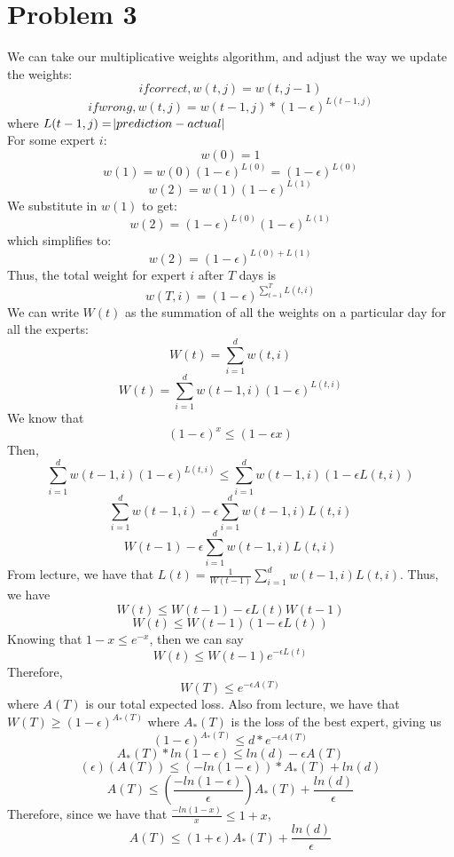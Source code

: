 \documentclass[12pt, letterpaper]{article}
\begin{document}
\section{Problem 3}
We can take our multiplicative weights algorithm, and adjust the way we update the weights:
\[if correct, w(t, j) = w(t, j-1)\]
\[if wrong, w(t, j) = w(t-1, j)*(1-\epsilon)^{L(t-1, j)}\]
where $L(t-1,j) = \abs{prediction-actual}$\\
For some expert $i$:
\[w(0)=1\]
\[w(1)=w(0)(1-\epsilon)^{L(0)}=(1-\epsilon)^{L(0)}\]
\[w(2)=w(1)(1-\epsilon)^{L(1)}\]
We substitute in $w(1)$ to get:
\[w(2)=(1-\epsilon)^{L(0)}(1-\epsilon)^{L(1)}\]
which simplifies to:
\[w(2)=(1-\epsilon)^{L(0)+L(1)}\]
Thus, the total weight for expert $i$ after $T$ days is
\[w(T, i)=(1-\epsilon)^{\sum_{t=1}^{T} L(t,i)}\]
We can write $W(t)$ as the summation of all the weights on a particular day for all the experts:
\[W(t) = \sum_{i=1}^{d}w(t,i)\]
\[W(t) = \sum_{i=1}^{d}w(t-1,i)(1-\epsilon)^{L(t,i)}\]
We know that 
\[(1-\epsilon)^x\leq (1-\epsilon x)\]
Then,
\[\sum_{i=1}^{d}w(t-1,i)(1-\epsilon)^{L(t,i)} \leq \sum_{i=1}^{d}w(t-1,i)(1-\epsilon L(t,i))\]
\[\sum_{i=1}^{d}w(t-1,i)-\epsilon \sum_{i=1}^{d}w(t-1,i)L(t,i)\]
\[W(t-1)-\epsilon \sum_{i=1}^{d}w(t-1,i)L(t,i)\]
From lecture, we have that $L(t)=\frac{1}{W(t-1)}\sum_{i=1}^{d}w(t-1, i)L(t,i)$. Thus, we have
\[W(t)\leq W(t-1) - \epsilon L(t)W(t-1)\]
\[W(t)\leq W(t-1) (1- \epsilon L(t))\]
Knowing that $1-x \leq e^{-x}$, then we can say
\[W(t)\leq W(t-1)e^{- \epsilon L(t)}\]
Therefore,
\[W(T) \leq e^{-\epsilon A(T)}\]
where $A(T)$ is our total expected loss.
Also from lecture, we have that $W(T)\geq (1-\epsilon)^{A_*(T)}$ where $A_*(T)$ is the loss of the best expert, giving us
\[(1-\epsilon)^{A_*(T)} \leq d*e^{-\epsilon A(T)}\]
\[A_*(T)*ln(1-\epsilon) \leq ln(d)-\epsilon A(T)\]
\[ (\epsilon)(A(T)) \leq (-ln(1-\epsilon)) * A_*(T)+ln(d)\]
\[A(T)\leq (\frac{-ln(1-\epsilon )}{\epsilon})A_*(T)+\frac{ln(d)}{\epsilon}\]
Therefore, since we have that $\frac{-ln(1-x)}{x}\leq 1+x$,
\[A(T) \leq (1+\epsilon)A_*(T)+\frac{ln(d)}{\epsilon}\]

\newpage
\end{document}
